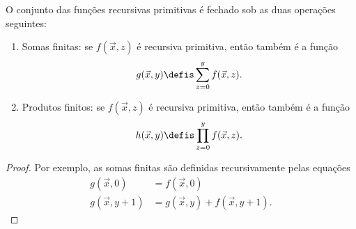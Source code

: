 \documentclass[../../../include/open-logic-section]{subfiles}
\begin{document}
\begin{prop}
O conjunto das funções recursivas primitivas é fechado sob as duas operações
seguintes:
\begin{enumerate}
\item Somas finitas: se $f(\vec x, z)$ é recursiva primitiva, então também é
a função
\[
g(\vec x, y) \defis \sum_{z = 0}^y f(\vec x, z).
\]
\item Produtos finitos: se $f(\vec x, z)$ é recursiva primitiva, então também
é a função
\[
h(\vec x, y) \defis \prod_{z = 0}^y f(\vec x, z).
\]
\end{enumerate}
\end{prop}

\begin{proof}
Por exemplo, as somas finitas são definidas recursivamente pelas equações
\begin{align*}
  g(\vec x, 0) & = f(\vec x, 0)\\
  g(\vec x, y+1) & = g(\vec x, y) + f(\vec x, y+1).
\end{align*}
\end{proof}
\end{document}
